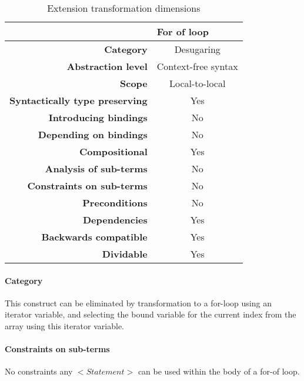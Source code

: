 \begin{table}[h]
\centering
\caption{Extension transformation dimensions}
\label{for-of-table}
\begin{tabular}{@{}rc@{}}
\toprule
                                       & \multicolumn{1}{l}{\textbf{For of loop}} \\ \midrule
\textbf{Category}                      & Desugaring
\\
\textbf{Abstraction level}          & Context-free syntax                          \\
\textbf{Scope}                         & Local-to-local                               \\
\textbf{Syntactically type preserving} & Yes                                          \\
\textbf{Introducing bindings}          & No                                          \\%
\textbf{Depending on bindings}         & No                                           \\
\textbf{Compositional}                 & Yes                                          \\
\textbf{Analysis of sub-terms}          & No                                          \\
\textbf{Constraints on sub-terms}       & No                                           \\
\textbf{Preconditions}                 & No                                          \\
\textbf{Dependencies}                  & Yes                                           \\
\textbf{Backwards compatible}          & Yes                                          \\
\textbf{Dividable}                     & Yes                                           \\ \bottomrule
\end{tabular}
\end{table}

\paragraph{Category}
This construct can be eliminated by transformation to a for-loop using an iterator variable, and selecting the bound variable for the current index from the array using this iterator variable.

\paragraph{Constraints on sub-terms}
No constraints any $<Statement>$ can be used within the body of a for-of loop.

